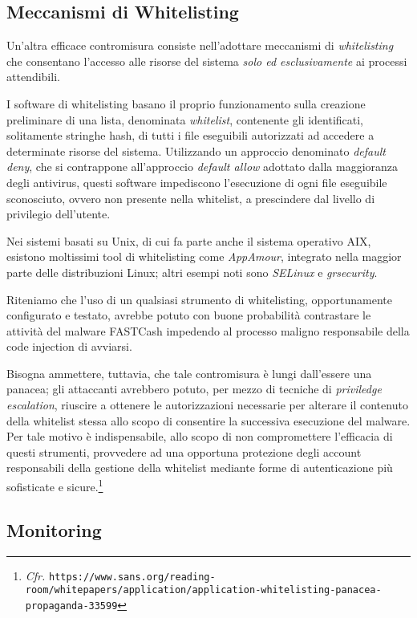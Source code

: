 \documentclass[10pt,a4paper, titlepage]{report}
\begin{document}
\subsection{Meccanismi di Whitelisting}

Un'altra efficace contromisura consiste nell'adottare meccanismi di \textit{whitelisting} che consentano l'accesso alle risorse del sistema \textit{solo ed esclusivamente} ai processi attendibili. 

I software di whitelisting basano il proprio funzionamento sulla creazione preliminare di una lista, denominata \textit{whitelist}, contenente gli identificati, solitamente stringhe hash, di tutti i file eseguibili autorizzati ad accedere a determinate risorse del sistema. Utilizzando un approccio denominato \textit{default deny}, che si contrappone all'approccio \textit{default allow} adottato dalla maggioranza degli antivirus, questi software impediscono l'esecuzione di ogni file eseguibile sconosciuto, ovvero non presente nella whitelist, a prescindere dal livello di privilegio dell'utente.

Nei sistemi basati su Unix, di cui fa parte anche il sistema operativo AIX, esistono moltissimi tool di whitelisting come \textit{AppAmour}, integrato nella maggior parte delle distribuzioni Linux; altri esempi noti sono \textit{SELinux} e \textit{grsecurity}.

Riteniamo che l'uso di un qualsiasi strumento di whitelisting, opportunamente configurato e testato, avrebbe potuto con buone probabilità contrastare le attività del malware FASTCash impedendo al processo maligno responsabile della code injection di avviarsi. 

Bisogna ammettere, tuttavia, che tale contromisura è lungi dall'essere una panacea; gli attaccanti avrebbero potuto, per mezzo di tecniche di \textit{priviledge escalation}, riuscire a ottenere le autorizzazioni necessarie per alterare il contenuto della whitelist stessa allo scopo di consentire la successiva esecuzione del malware. Per tale motivo è indispensabile, allo scopo di non compromettere l'efficacia di questi strumenti, provvedere ad una opportuna protezione degli account responsabili della gestione della whitelist mediante forme di autenticazione più sofisticate e sicure.\footnote{\textit{Cfr.} \texttt{https://www.sans.org/reading-room/whitepapers/application/application-whitelisting-panacea-propaganda-33599}}

\subsection{Monitoring}
\end{document}

